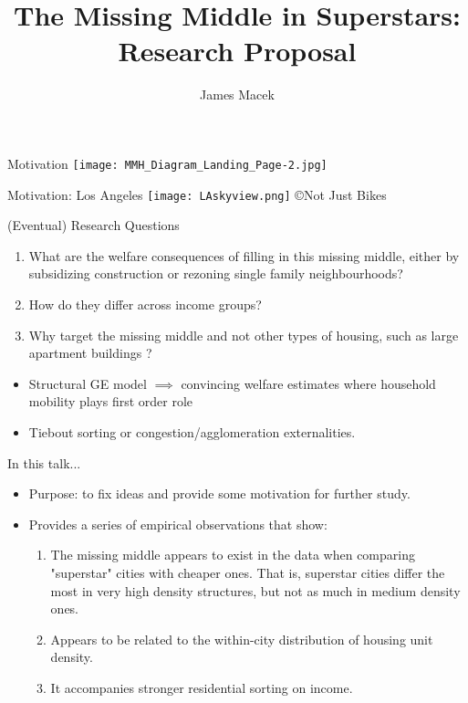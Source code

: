 \documentclass{beamer}
\title{The Missing Middle in Superstars: Research Proposal}
\author{James Macek}
\theoremstyle{plain}
\begin{document}
\begin{frame}[plain]
	\maketitle
\end{frame}

\begin{frame}{Motivation}
\texttt{[image: MMH\_Diagram\_Landing\_Page-2.jpg]}
\end{frame}

\begin{frame}{Motivation: Los Angeles}
\texttt{[image: LAskyview.png]}
\copyright Not Just Bikes
\end{frame}

\begin{frame}{(Eventual) Research Questions}
\begin{enumerate}
	\itemsep1em
 	\item What are the welfare consequences of filling in this missing middle, either by subsidizing construction or rezoning single family neighbourhoods? \pause
 	\item How do they differ across income groups? \pause
 	\item Why target the missing middle and not other types of housing, such as large apartment buildings \citep{asquithetallocaleffects}?
\end{enumerate}
\begin{itemize}
	\item Structural GE model $\implies$ convincing welfare estimates where household mobility plays first order role
	\item Tiebout sorting or congestion/agglomeration externalities.
\end{itemize}
\end{frame}

\begin{frame}{In this talk...} 
\begin{itemize}
	\itemsep1em
	\item Purpose: to fix ideas and provide some motivation for further study. \pause 
	\item Provides a series of empirical observations that show:
	\begin{enumerate}
		\itemsep1em
		\color{black}
		\item The missing middle appears to exist in the data when comparing "superstar" cities with cheaper ones. That is, superstar cities differ the most in very high density structures, but not as much in medium density ones. \pause
		\item Appears to be related to the within-city distribution of housing unit density. \pause
		\item It accompanies stronger residential sorting on income. 
	\end{enumerate}
\end{itemize}
\end{frame}
\end{document}
